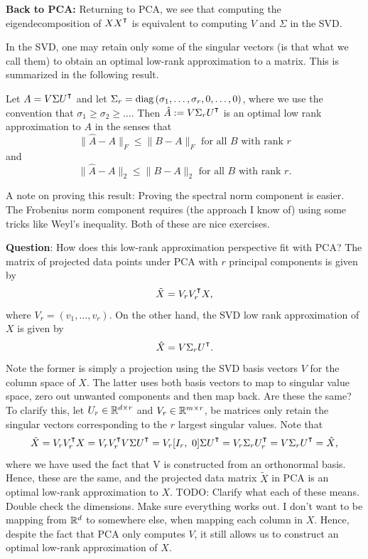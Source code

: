 \vspace{1em}
\noindent
\textbf{Back to PCA:} Returning to PCA, we see that computing the eigendecomposition of $XX^\T$ is equivalent to computing $V$ and $\Sigma$ in the SVD. 

In the SVD, one may retain only some of the singular vectors (is that what we call them) to obtain an optimal low-rank approximation to a matrix. This is summarized in the following result. 

\begin{theorem}
Let $A = V\Sigma U^\T$ and let $\Sigma_r = \textup{diag}\,(\sigma_1,\ldots, \sigma_r, 0,\ldots,0)$, where we use the convention that $\sigma_1\geq \sigma_2\geq \ldots$. Then $\hat A := V\Sigma_r U^\T$ is an optimal low rank approximation to $A$ in the senses that
$$
\|\hat A - A\|_F \leq \|B - A\|_F \mbox{ for all $B$ with rank $r$}
$$
and
$$
\|\hat A - A\|_2 \leq \|B - A\|_2 \mbox{ for all $B$ with rank $r$}.
$$
\end{theorem}
A note on proving this result: Proving the spectral norm component is easier. The Frobenius norm component requires (the approach I know of) using some tricks like Weyl's inequality. Both of these are nice exercises. 

\vspace{1em}
\textbf{Question}: How does this low-rank approximation perspective fit with PCA? 
The matrix of projected data points under PCA with $r$ principal components is given by 
$$
\tilde X = V_r V_r^\T X,
$$
where $V_r = (v_1,\ldots, v_r)$. On the other hand, the SVD low rank approximation of $X$ is given by
$$
\hat X = V \Sigma_r U^\T. 
$$
Note the former is simply a projection using the SVD basis vectors $V$ for the column space of $X$. The latter uses both basis vectors to map to singular value space, zero out unwanted components and then map back. Are these the same? 
To clarify this, let
$U_r\in \mathbb{R}^{d\times r}$ and $V_r \in \mathbb{R}^{m\times r}$, be matrices only retain the singular vectors corresponding to the $r$ largest singular values. Note that 
$$
\tilde X = V_r V_r^\T X = V_r V_r^\T V \Sigma U^\T = V_r [I_r, ~0] \Sigma U^\T = V_r \Sigma_r U_r^\T = V \Sigma_r U^\T = \hat X,
$$ 
where we have used the fact that V is constructed from an orthonormal basis. Hence, these are the same, and the projected data matrix $\tilde X$ in PCA is an optimal low-rank approximation to $X$. 
TODO: Clarify what each of these means. Double check the dimensions. Make sure everything works out. I don't want to be mapping from $\mathbb{R}^d$ to somewhere else, when mapping each column in $X$. 
Hence, despite the fact that PCA only computes $V$, it still allows us to construct an optimal low-rank approximation of $X$. 

